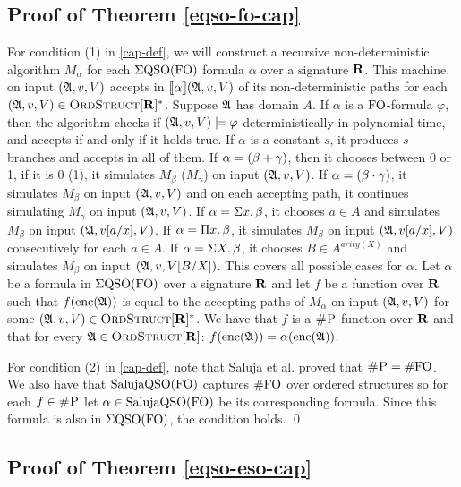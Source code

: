 \subsection{Proof of Theorem \ref{eqso-fo-cap}}

For condition (1) in \ref{cap-def}, we will construct a recursive non-deterministic algorithm $M_{\alpha}$ for each $\Sigma{\rm QSO}({\rm FO})$ formula $\alpha$ over a signature $\mathbf{R}$. This machine, on input $(\mathfrak{A},v,V)$ accepts in ${\llbracket{}{\alpha}\rrbracket}(\mathfrak{A},v,V)$ of its non-deterministic paths for each $(\mathfrak{A},v,V) \in \text{\sc OrdStruct}[\mathbf{R}]^*$. Suppose $\mathfrak{A}$ has domain $A$. If $\alpha$ is a ${\rm FO}$-formula $\varphi$, then the algorithm checks if $(\mathfrak{A},v,V)\models\varphi$ deterministically in polynomial time, and accepts if and only if it holds true. If $\alpha$ is a constant $s$, it produces $s$ branches and accepts in all of them. If $\alpha = (\beta + \gamma)$, then it chooses between 0 or 1, if it is 0 (1), it simulates $M_{\beta}$ ($M_{\gamma}$) on input $(\mathfrak{A},v,V)$. If $\alpha = (\beta \cdot \gamma)$, it simulates $M_{\beta}$ on input $(\mathfrak{A},v,V)$ and on each accepting path, it continues simulating $M_{\gamma}$ on input $(\mathfrak{A},v,V)$. If $\alpha = \Sigma{x}.\,\beta$, it chooses $a\in A$ and simulates $M_{\beta}$ on input $(\mathfrak{A},v[a/x],V)$. If $\alpha = \Pi{x}.\,\beta$, it simulates $M_{\beta}$ on input $(\mathfrak{A},v[a/x],V)$ consecutively for each $a\in A$. If $\alpha = \Sigma{X}.\,\beta$, it chooses $B\in A^{arity(X)}$ and simulates $M_{\beta}$ on input $(\mathfrak{A},v,V[B/X])$. This covers all possible cases for $\alpha$. Let $\alpha$ be a formula in $\Sigma{\rm QSO}({\rm FO})$ over a signature $\mathbf{R}$ and let $f$ be a function over $\mathbf{R}$ such that $f({\rm enc}(\mathfrak{A}))$ is equal to the accepting paths of $M_{\alpha}$ on input $(\mathfrak{A},v,V)$ for some $(\mathfrak{A},v,V) \in \text{\sc OrdStruct}[\mathbf{R}]^*$. We have that $f$ is a $\text{\sc \#P}$ function over $\mathbf{R}$ and that for every $\mathfrak{A}\in\text{\sc OrdStruct}[\mathbf{R}]$: $f({\rm enc}(\mathfrak{A})) = \alpha({\rm enc}(\mathfrak{A}))$.

For condition (2) in \ref{cap-def}, note that Saluja et al. \cite{DBLP:journals/jcss/SalujaST95} proved that $\text{\sc \#P} = \#{\rm FO}$. We also have that $\text{\rm Saluja}{\rm QSO}({\rm FO})$ captures $\#{\rm FO}$ over ordered structures so for each $f\in \text{\sc \#P}$ let $\alpha \in \text{\rm Saluja}{\rm QSO}({\rm FO})$ be its corresponding formula. Since this formula is also in $\Sigma{\rm QSO}({\rm FO})$, the condition holds. \qed

\subsection{Proof of Theorem \ref{eqso-eso-cap}}


